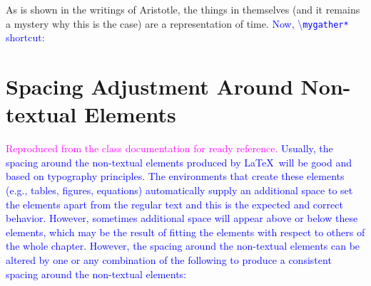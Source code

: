 \documentclass[phd]{ndsu-thesis-2022}
\newcommand\italk[1]{\textcolor{blue}{#1}}  %
\newcommand\cmd[1]{\textbackslash\texttt{#1}}  %
\begin{document}
\noindent As is shown in the writings of Aristotle, the things in themselves (and it remains a mystery why this is the case) are a representation of time. \italk{Now, \cmd{mygather*} shortcut:}


\section{Spacing Adjustment Around Non-textual Elements}
\textcolor{magenta}{Reproduced from the class documentation	for ready reference.} \italk{Usually, the spacing around the non-textual elements produced by \LaTeX\ will be good and based on typography principles. The environments that create these elements (e.g., tables, figures, equations) automatically supply an additional space to set the elements apart from the regular text and this is the expected and correct behavior. However, sometimes additional space will appear above or below these elements, which may be the result of fitting the elements with respect to others of the whole chapter. However, the spacing around the non-textual elements can be altered by one or any combination of the following to produce a consistent spacing around the non-textual elements:}
\end{document}

